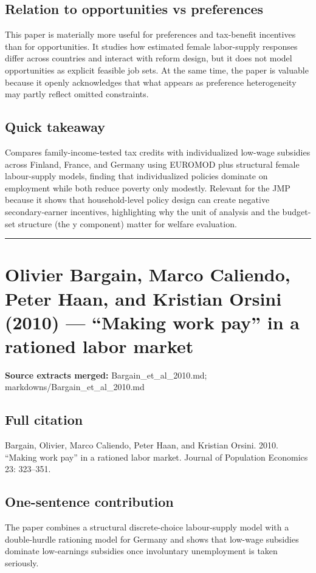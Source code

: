 \documentclass[11pt,a4paper]{article}
\begin{document}
\subsection*{Relation to opportunities vs preferences}
This paper is materially more useful for preferences and tax-benefit incentives than for opportunities. It studies how estimated female labor-supply responses differ across countries and interact with reform design, but it does not model opportunities as explicit feasible job sets. At the same time, the paper is valuable because it openly acknowledges that what appears as preference heterogeneity may partly reflect omitted constraints.

\subsection*{Quick takeaway}
Compares family-income-tested tax credits with individualized low-wage subsidies across Finland, France, and Germany using EUROMOD plus structural female labour-supply models, finding that individualized policies dominate on employment while both reduce poverty only modestly. Relevant for the JMP because it shows that household-level policy design can create negative secondary-earner incentives, highlighting why the unit of analysis and the budget-set structure (the y component) matter for welfare evaluation.


\medskip\hrule\medskip

\section*{Olivier Bargain, Marco Caliendo, Peter Haan, and Kristian Orsini (2010) — “Making work pay” in a rationed labor market}

\textbf{Source extracts merged:} Bargain\_et\_al\_2010.md; markdowns/Bargain\_et\_al\_2010.md

\subsection*{Full citation}
Bargain, Olivier, Marco Caliendo, Peter Haan, and Kristian Orsini. 2010. “Making work pay” in a rationed labor market. Journal of Population Economics 23: 323–351.

\subsection*{One-sentence contribution}
The paper combines a structural discrete-choice labour-supply model with a double-hurdle rationing model for Germany and shows that low-wage subsidies dominate low-earnings subsidies once involuntary unemployment is taken seriously.
\end{document}
